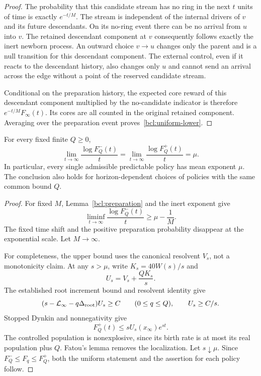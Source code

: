 \begin{proof}
The probability that this candidate stream has no ring in the next
$t$ units of time is exactly $e^{-t/M}$.  The stream is independent
of the internal drivers of $v$ and its future descendants.  On its
no-ring event there can be no arrival from $u$ into $v$.  The retained
descendant component at $v$ consequently follows exactly the inert
newborn process.  An outward choice $v\to u$ changes only the parent
and is a null transition for this descendant component.  The external
control, even if it reacts to the descendant history, also changes
only $u$ and cannot send an arrival across the edge without a point
of the reserved candidate stream.

Conditional on the preparation history, the expected core reward of
this descendant component multiplied by the no-candidate indicator is
therefore $e^{-t/M}F_\infty(t)$.  Its cores are all counted in the
original retained component.  Averaging over the preparation event
proves~\eqref{bcl:uniform-lower}.
\end{proof}

\begin{theorem}
\label{bcl:matching}
For every fixed finite $Q\ge0$,
\begin{equation}\label{bcl:inf-sup}
 \boxed{
 \lim_{t\to\infty}\frac{\log F_Q^-(t)}t
 =\lim_{t\to\infty}\frac{\log F_Q^+(t)}t
 =\mu.
 }
\end{equation}
In particular, every single admissible predictable policy has mean
exponent $\mu$.  The conclusion also holds for horizon-dependent
choices of policies with the same common bound $Q$.
\end{theorem}
\begin{proof}
For fixed $M$, Lemma~\ref{bcl:preparation} and the inert exponent give
\[
 \liminf_{t\to\infty}\frac{\log F_Q^-(t)}t
 \ge\mu-\frac1M.
\]
The fixed time shift and the positive preparation probability disappear
at the exponential scale.  Let $M\to\infty$.

For completeness, the upper bound uses the canonical resolvent
$V_s$, not a monotonicity claim.  At any $s>\mu$, write
$K_s=40W(s)/s$ and
\[
 U_s=V_s+\frac{QK_s}{s}.
\]
The established root increment bound and resolvent identity give
\[
 (s-\mathcal L_\infty-q\Delta_{\rm root})U_s\ge C
 \qquad(0\le q\le Q),\qquad U_s\ge C/s.
\]
Stopped Dynkin and nonnegativity give
\[
 F_Q^+(t)\le sU_s(x_\infty)e^{st}.
\]
The controlled population is nonexplosive, since its birth rate is at
most its real population plus $Q$.  Fatou's lemma removes the
localization.  Let $s\downarrow\mu$.  Since
$F_Q^-\le F_q\le F_Q^+$, both the uniform statement and the assertion
for each policy follow.
\end{proof}

